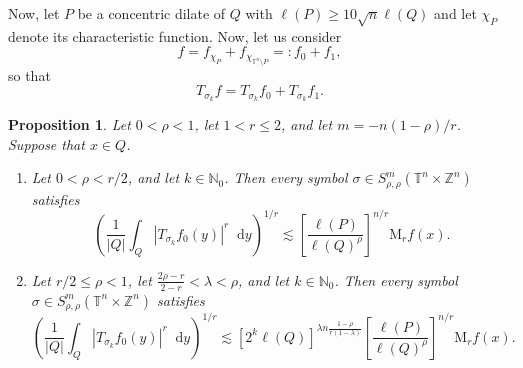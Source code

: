 \documentclass[12pt, reqno]{amsart}
\newtheorem{proposition}[theorem]{Proposition}
\theoremstyle{definition}
\theoremstyle{remark}
\numberwithin{equation}{section}
\newcommand*\diff{\mathop{}\!\mathrm{d}}
\begin{document}
Now, let $P$ be a concentric dilate of $Q$ with $\ell(P)\geq 10\sqrt{n}\ell(Q)$ and let $\chi_P$ denote its characteristic function. Now, let us consider 
\begin{equation}
    f = f_{\chi_P} + f_{\chi_{\mathbb{T}^n\setminus P}} =: f_0 + f_1,
    \label{eq:decomposition}
\end{equation}
so that
\begin{equation*}
    T_{\sigma_k}f = T_{\sigma_k}f_0 + T_{\sigma_k}f_1.
\end{equation*}

\begin{proposition}
    Let $0<\rho<1$, let $1<r\leq2$, and let $m=-n(1-\rho)/r$. Suppose that $x\in Q$.

    \begin{enumerate}
        \item Let $0<\rho<r/2$, and let $k\in\mathbb{N}_0$. Then every symbol $\sigma \in S^m_{\rho,\rho}(\mathbb{T}^n \times \mathbb{Z}^n) $ satisfies
        \begin{equation}
            \left( \frac{1}{|Q|}\int_Q |T_{\sigma_k} f_0(y)|^r\diff y  
            \right)^{1/r} \lesssim \left[ \frac{\ell(P)}{\ell(Q)^\rho} 
            \right]^{n/r} \mathrm{M}_rf(x).
            \label{eq:fo-estimate-rho-less}
        \end{equation}
        \item Let $r/2\leq \rho <1$, let $ \frac{2\rho - r}{2-r} < \lambda < \rho$, and let $k\in\mathbb{N}_0$. Then every symbol $\sigma \in S^m_{\rho,\rho}(\mathbb{T}^n \times \mathbb{Z}^n) $ satisfies
        \begin{equation}
            \left( \frac{1}{|Q|}\int_Q|T_{\sigma_k}f_0(y)|^r \diff y
            \right)^{1/r} \lesssim [2^k\ell(Q)]^{\lambda n \frac{1-\rho}{r(1-\lambda)}} \left[ \frac{\ell(P)}{\ell(Q)^\rho}
            \right]^{n/r} \mathrm{M}_rf(x).
            \label{eq:f0-estimate-rho-greater}
        \end{equation}
    \end{enumerate}
    
    
    
    
\end{proposition}
\end{document}
